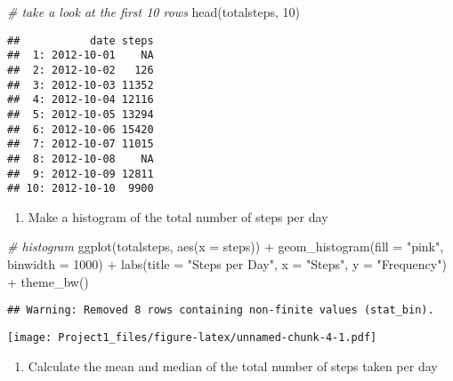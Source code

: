 \documentclass[
]{article}
\newenvironment{Shaded}{\begin{snugshade}}{\end{snugshade}}
\newcommand{\AttributeTok}[1]{\textcolor[rgb]{0.77,0.63,0.00}{#1}}
\newcommand{\CommentTok}[1]{\textcolor[rgb]{0.56,0.35,0.01}{\textit{#1}}}
\newcommand{\DecValTok}[1]{\textcolor[rgb]{0.00,0.00,0.81}{#1}}
\newcommand{\FunctionTok}[1]{\textcolor[rgb]{0.00,0.00,0.00}{#1}}
\newcommand{\NormalTok}[1]{#1}
\newcommand{\SpecialCharTok}[1]{\textcolor[rgb]{0.00,0.00,0.00}{#1}}
\newcommand{\StringTok}[1]{\textcolor[rgb]{0.31,0.60,0.02}{#1}}
\providecommand{\tightlist}{%
  \setlength{\itemsep}{0pt}\setlength{\parskip}{0pt}}
\begin{document}
\begin{Shaded}
\begin{Highlighting}[]
\CommentTok{\# take a look at the first 10 rows}
\FunctionTok{head}\NormalTok{(totalsteps, }\DecValTok{10}\NormalTok{)}
\end{Highlighting}
\end{Shaded}

\begin{verbatim}
##           date steps
##  1: 2012-10-01    NA
##  2: 2012-10-02   126
##  3: 2012-10-03 11352
##  4: 2012-10-04 12116
##  5: 2012-10-05 13294
##  6: 2012-10-06 15420
##  7: 2012-10-07 11015
##  8: 2012-10-08    NA
##  9: 2012-10-09 12811
## 10: 2012-10-10  9900
\end{verbatim}

\begin{enumerate}
\def\labelenumi{\arabic{enumi}.}
\setcounter{enumi}{1}
\tightlist
\item
  Make a histogram of the total number of steps per day
\end{enumerate}

\begin{Shaded}
\begin{Highlighting}[]
\CommentTok{\# histogram}
\FunctionTok{ggplot}\NormalTok{(totalsteps, }\FunctionTok{aes}\NormalTok{(}\AttributeTok{x =}\NormalTok{ steps)) }\SpecialCharTok{+}
    \FunctionTok{geom\_histogram}\NormalTok{(}\AttributeTok{fill =} \StringTok{"pink"}\NormalTok{, }\AttributeTok{binwidth =} \DecValTok{1000}\NormalTok{) }\SpecialCharTok{+}
    \FunctionTok{labs}\NormalTok{(}\AttributeTok{title =} \StringTok{"Steps per Day"}\NormalTok{, }\AttributeTok{x =} \StringTok{"Steps"}\NormalTok{, }\AttributeTok{y =} \StringTok{"Frequency"}\NormalTok{) }\SpecialCharTok{+} 
    \FunctionTok{theme\_bw}\NormalTok{()}
\end{Highlighting}
\end{Shaded}

\begin{verbatim}
## Warning: Removed 8 rows containing non-finite values (stat_bin).
\end{verbatim}

\texttt{[image: Project1\_files/figure-latex/unnamed-chunk-4-1.pdf]}

\begin{enumerate}
\def\labelenumi{\arabic{enumi}.}
\setcounter{enumi}{2}
\tightlist
\item
  Calculate the mean and median of the total number of steps taken per
  day
\end{enumerate}
\end{document}
